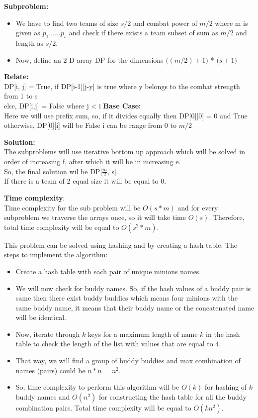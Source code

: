 \documentclass[12pt,twoside]{article}
\begin{document}
\begin{problems}
\textbf{Subproblem: }
\begin{itemize}
    \item We have to find two teams of size $s/2$ and combat power of $m/2$ where m is given as $p_1 ...... p_s$ and check if there exists a team subset of sum as $m/2$ and length as $s/2$.
    \item Now, define an 2-D array DP for the dimensions $\big((m/2) + 1\big)$ * $\big(s + 1\big)$
\end{itemize}
\newline  
\textbf{Relate: }\\
DP[i, j] = True, if DP[i-1][j-y] is true where y belongs to the combat strength from 1 to s \\
else, DP[i,j] = False where j < i
\newline 
\textbf{Base Case:} \\
Here we will use prefix sum,
so, if it divides equally then DP[0][0] = 0  and True\\
otherwise, DP[0][i] will be False {i can be range from 0 to $m/2$}

\textbf{Solution:}\\
The subproblems will use iterative bottom up approach which will be solved in order of increasing f, after which it will be in increasing e.
\\
So, the final solution wil be DP[$\frac{m}{2}$, s]. \\
If there is a team of 2 equal size it will be equal to 0.

\textbf{Time complexity}:\\ 
Time complexity for the sub problem will be $O(s*m)$ and for every subproblem we traverse the arrays once, so it will take time $O(s)$. Therefore, total time complexity will be equal to $O(s^2 * m)$.

\newpage
\problem  %
This problem can be solved using hashing and by creating a hash table.
The steps to implement the algorithm:
\begin{itemize}
    \item Create a hash table with each pair of unique minions names.
    \item We will now check for buddy names. So, if the hash values of a buddy pair is same then there exist buddy buddies which means four minions with the same buddy name, it means that their buddy name or the concatenated name will be identical. 
    \item Now, iterate through $k$ keys for a maximum length of name $k$  in the hash table to check the length of the list with values that are equal to 4.
    \item That way, we will find a group of buddy buddies and max combination of names (pairs) could be $n * n$ = $n^2$.
    \item So, time complexity to perform this algorithm will be $O(k)$ for hashing of $k$ buddy names and $O(n^2)$ for constructing the hash table for all the buddy combination pairs. Total time complexity will be equal to $O(kn^2)$.
\end{itemize}



\end{problems}
\end{document}
